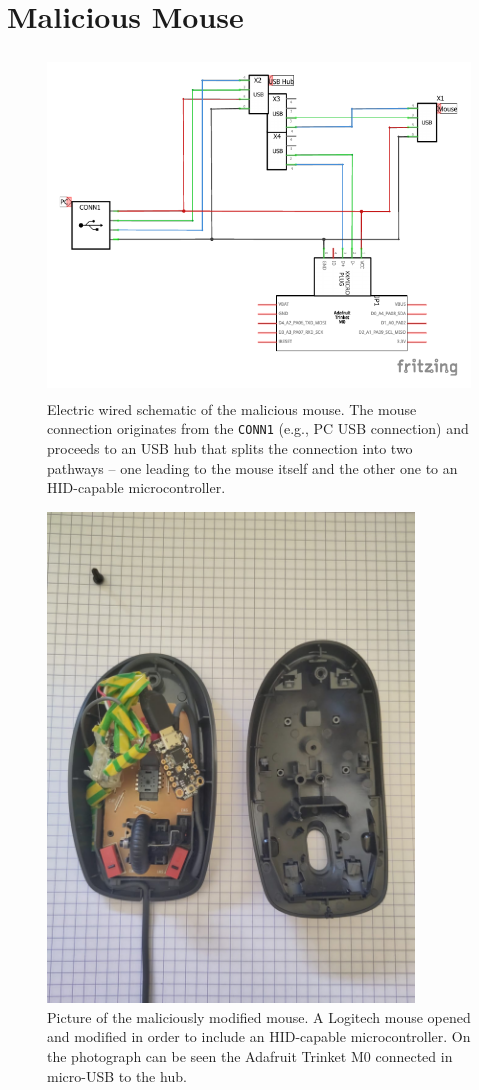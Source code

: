 \chapter{Malicious Mouse}
\begin{figure}[H]
    \centering
    \includegraphics[height=9cm, angle=90, trim={0cm 0cm 0cm 0cm},clip]{figures/Sketch_wired_mouse_basUSB.pdf}
    \caption{Electric wired schematic of the malicious mouse. The mouse connection originates from the  \texttt{CONN1} (e.g., PC USB connection) and proceeds to an USB hub that splits the connection into two pathways – one leading to the mouse itself and the other one to an HID-capable microcontroller.}
    \label{fig:infected-mouse-wiring}
\end{figure}

\begin{figure}
    \centering
    \includegraphics[height=13cm, trim={0cm 5cm 0cm 5cm},clip]{figures/infected-mouse.jpeg}
    \caption{Picture of the maliciously modified mouse. A Logitech mouse opened and modified in order to include an HID-capable microcontroller. On the photograph can be seen the Adafruit Trinket M0 connected in micro-USB to the hub.}
    \label{fig:infected-mouse-photo}
\end{figure}

